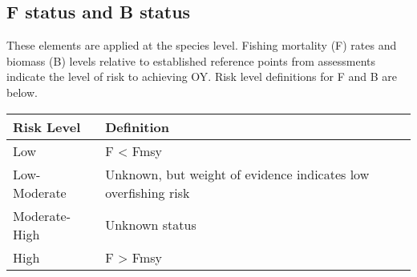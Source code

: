 \documentclass[11pt,]{article}
\begin{document}
\subsection{F status and B status}\label{f-status-and-b-status}

These elements are applied at the species level. Fishing mortality (F)
rates and biomass (B) levels relative to established reference points
from assessments indicate the level of risk to achieving OY. Risk level
definitions for F and B are below.

\begin{longtable}[]{@{}ll@{}}
\toprule
\begin{minipage}[b]{0.22\columnwidth}\raggedright\strut
Risk Level\strut
\end{minipage} & \begin{minipage}[b]{0.72\columnwidth}\raggedright\strut
Definition\strut
\end{minipage}\tabularnewline
\midrule
\endhead
\begin{minipage}[t]{0.22\columnwidth}\raggedright\strut
Low\strut
\end{minipage} & \begin{minipage}[t]{0.72\columnwidth}\raggedright\strut
F \textless{} Fmsy\strut
\end{minipage}\tabularnewline
\begin{minipage}[t]{0.22\columnwidth}\raggedright\strut
Low-Moderate\strut
\end{minipage} & \begin{minipage}[t]{0.72\columnwidth}\raggedright\strut
Unknown, but weight of evidence indicates low overfishing risk\strut
\end{minipage}\tabularnewline
\begin{minipage}[t]{0.22\columnwidth}\raggedright\strut
Moderate-High\strut
\end{minipage} & \begin{minipage}[t]{0.72\columnwidth}\raggedright\strut
Unknown status\strut
\end{minipage}\tabularnewline
\begin{minipage}[t]{0.22\columnwidth}\raggedright\strut
High\strut
\end{minipage} & \begin{minipage}[t]{0.72\columnwidth}\raggedright\strut
F \textgreater{} Fmsy\strut
\end{minipage}\tabularnewline
\bottomrule
\end{longtable}
\end{document}
